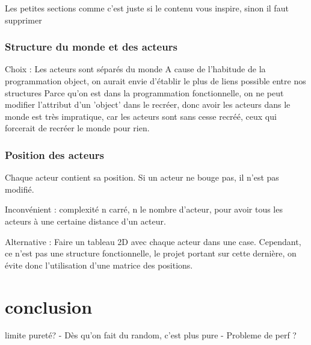 \documentclass{article}
\begin{document}
Les petites sections comme c'est juste si le contenu vous inspire, sinon il faut supprimer
\subsubsection{Structure du monde et des acteurs}
Choix : Les acteurs sont séparés du monde
A cause de l'habitude de la programmation object, on aurait envie d'établir le plus de liens possible entre nos structures
Parce qu'on est dans la programmation fonctionnelle, on ne peut modifier l'attribut d'un 'object' dans le recréer, 
donc avoir les acteurs dans le monde est très impratique, car les acteurs sont sans cesse recréé, ceux qui forcerait de 
recréer le monde pour rien.

\subsubsection{Position des acteurs}
Chaque acteur contient sa position.
Si un acteur ne bouge pas, il n'est pas modifié.

Inconvénient : complexité n carré, n le nombre d'acteur, pour avoir tous les acteurs à une certaine distance d'un acteur.

Alternative : Faire un tableau 2D avec chaque acteur dans une case. Cependant, ce n'est pas une structure fonctionnelle, 
le projet portant sur cette dernière, on évite donc l'utilisation d'une matrice des positions.

\section{conclusion}
limite pureté?
- Dès qu'on fait du random, c'est plus pure
- Probleme de perf ?
\end{document}

